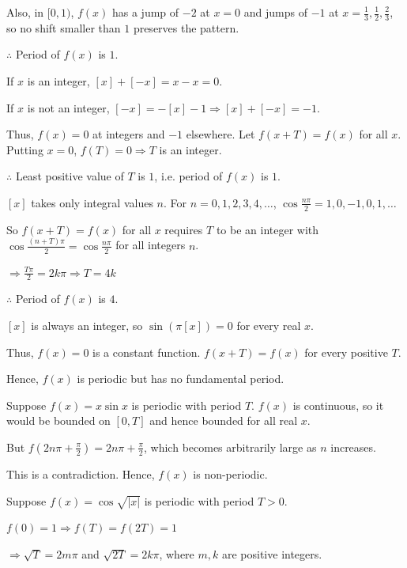   Also, in $[0, 1)$, $f(x)$ has a jump of $-2$ at $x = 0$ and jumps of $-1$ at $x = \frac{1}{3},
  \frac{1}{2}, \frac{2}{3}$, so no shift smaller than $1$ preserves the pattern.

  $\therefore$ Period of $f(x)$ is $1$.

\item If $x$ is an integer, $[x] + [-x] = x - x = 0$.

  If $x$ is not an integer, $[-x] = -[x] - 1 \Rightarrow [x] + [-x] = -1$.

  Thus, $f(x) = 0$ at integers and $-1$ elsewhere. Let $f(x + T) = f(x)$ for all $x$. Putting
  $x = 0$, $f(T) = 0 \Rightarrow T$ is an integer.

  $\therefore$ Least positive value of $T$ is $1$, i.e. period of $f(x)$ is $1$.

\item $[x]$ takes only integral values $n$. For $n = 0, 1, 2, 3, 4, \ldots$, $\cos\frac{n\pi}{2} = 1,
  0, -1, 0, 1, \ldots$

  So $f(x + T) = f(x)$ for all $x$ requires $T$ to be an integer with $\cos\frac{(n + T)\pi}{2} =
  \cos\frac{n\pi}{2}$ for all integers $n$.

  $\Rightarrow \frac{T\pi}{2} = 2k\pi \Rightarrow T = 4k$

  $\therefore$ Period of $f(x)$ is $4$.

\item $[x]$ is always an integer, so $\sin(\pi[x]) = 0$ for every real $x$.

  Thus, $f(x) = 0$ is a constant function. $f(x + T) = f(x)$ for every positive $T$.

  Hence, $f(x)$ is periodic but has no fundamental period.

\item Suppose $f(x) = x\sin x$ is periodic with period $T$. $f(x)$ is continuous, so it would be
  bounded on $[0, T]$ and hence bounded for all real $x$.

  But $f\left(2n\pi + \frac{\pi}{2}\right) = 2n\pi + \frac{\pi}{2}$, which becomes arbitrarily large as $n$
  increases.

  This is a contradiction. Hence, $f(x)$ is non-periodic.

\item Suppose $f(x) = \cos\sqrt{|x|}$ is periodic with period $T > 0$.

  $f(0) = 1 \Rightarrow f(T) = f(2T) = 1$

  $\Rightarrow \sqrt{T} = 2m\pi$ and $\sqrt{2T} = 2k\pi$, where $m, k$ are positive integers.

